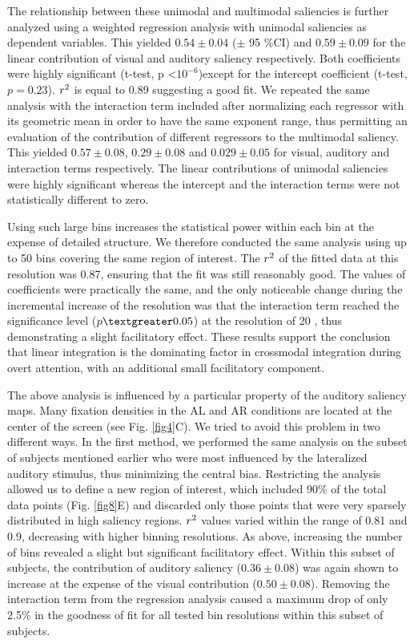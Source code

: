 The relationship between these unimodal and multimodal saliencies is
further analyzed using a weighted regression analysis with unimodal
saliencies as dependent variables. This yielded $0.54 \pm0.04$ ($\pm$ 95
\%CI) and $0.59 \pm0.09$ for the linear contribution of visual and auditory
saliency respectively. Both coefficients were highly significant (t-test, p
\textless $10^{-6}$)except for the intercept coefficient (t-test, $p =
0.23$). $r\textsuperscript{2}$ is equal to 0.89 suggesting a good fit. We
repeated the same analysis with the interaction term included after
normalizing each regressor with its geometric mean in order to have the
same exponent range, thus permitting an evaluation of the contribution of
different regressors to the multimodal saliency. This yielded $0.57
\pm0.08$, $0.29 \pm0.08$ and $0.029 \pm0.05$ for visual, auditory and
interaction terms respectively. The linear contributions of unimodal
saliencies were highly significant whereas the intercept and the
interaction terms were not statistically different to zero.

Using such large bins increases the statistical power within each bin at
the expense of detailed structure. We therefore conducted the same analysis
using up to 50 bins covering the same region of interest. The
$r\textsuperscript{2}$ of the fitted data at this resolution was 0.87,
ensuring that the fit was still reasonably good. The values of coefficients
were practically the same, and the only noticeable change during the
incremental increase of the resolution was that the interaction term
reached the significance level ($p \textgreater 0.05$) at the resolution of
20 , thus demonstrating a slight facilitatory effect. These
results support the conclusion that linear integration is the dominating
factor in crossmodal integration during overt attention, with an additional
small facilitatory component. 

The above analysis is influenced by a particular property of the auditory
saliency maps. Many fixation densities in the AL and AR conditions are
located at the center of the screen (see Fig. \ref{fig4}C). We tried to avoid
this problem in two different ways. In the first method, we performed the
same analysis on the subset of subjects mentioned earlier who were most
influenced by the lateralized auditory stimulus, thus minimizing the
central bias. Restricting the analysis allowed us to define a new region of
interest, which included 90\% of the total data points (Fig. \ref{fig8}E) and
discarded only those points that were very sparsely distributed in high
saliency regions. $r\textsuperscript{2}$ values varied within the range of
0.81 and 0.9, decreasing with higher binning resolutions. As above,
increasing the number of bins revealed a slight but significant
facilitatory effect. Within this subset of subjects, the contribution of
auditory saliency ($0.36 \pm0.08$) was again shown to increase at the
expense of the visual contribution ($0.50 \pm0.08$). Removing the
interaction term from the regression analysis caused a maximum drop of only
2.5\% in the goodness of fit for all tested bin resolutions within this
subset of subjects. 


